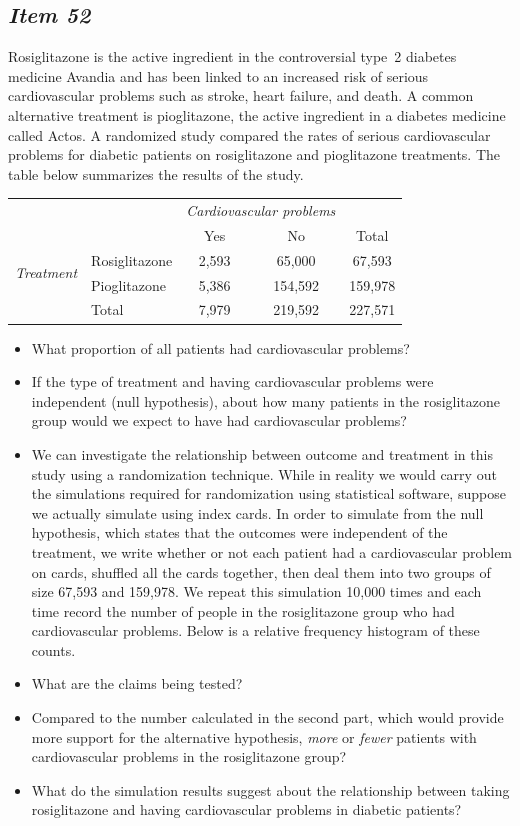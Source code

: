 \subsection{\textbf{\textit{Item 52}}}


Rosiglitazone is the active ingredient in the controversial type~2 diabetes medicine Avandia and has been linked to an increased risk of serious cardiovascular problems such as stroke, heart failure, and death. A common alternative treatment is pioglitazone, the active ingredient in a diabetes medicine called Actos. 
A randomized study compared the rates of serious cardiovascular problems for diabetic patients on rosiglitazone and pioglitazone treatments. The table below summarizes the results of the study.
\begin{center}
\begin{tabular}{ll  cc c} 
								&				& \multicolumn{2}{c}{\textit{Cardiovascular problems}} \\
\cline{3-4}	
								&				& Yes 	& No 		& Total	\\
\cline{2-5}
\multirow{2}{*}{\textit{Treatment}}		& Rosiglitazone 	& 2,593	& 65,000		& 67,593 	\\
								& Pioglitazone		& 5,386 	& 154,592 	& 159,978\\
\cline{2-5}
								&Total			& 7,979	& 219,592		& 227,571
\end{tabular}
\end{center}
\begin{itemize}
\item What proportion of all patients had cardiovascular problems?
\item If the type of treatment and having cardiovascular problems were independent (null hypothesis), about how many patients in the rosiglitazone group would we expect to have had cardiovascular problems?
\item We can investigate the relationship between outcome and treatment in this study using a randomization technique.  While in reality we would carry out the simulations required for randomization using statistical software, suppose we actually simulate using index cards. In order to simulate from the null hypothesis, which states that the outcomes were independent of the treatment, we write whether or not each patient had a cardiovascular problem on cards, shuffled all the cards together, then deal them into two groups of size 67,593 and 159,978. We repeat this simulation 10,000 times and each time record the number of people in the rosiglitazone group who had cardiovascular problems. Below is a relative frequency histogram of these counts.
\item What are the claims being tested?
\item Compared to the number calculated in the second part, which would provide more support for the alternative hypothesis,  \textit{more} or \textit{fewer} patients with cardiovascular problems in the rosiglitazone group?
\item What do the simulation results suggest about the relationship between taking rosiglitazone and having cardiovascular problems in diabetic patients?
\end{itemize}
